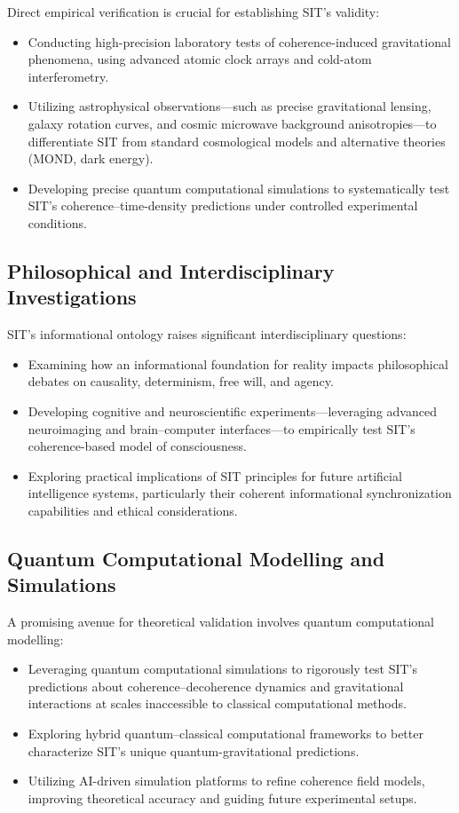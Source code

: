 Direct empirical verification is crucial for establishing SIT's validity:
\begin{itemize}
    \item Conducting high-precision laboratory tests of coherence-induced gravitational phenomena, using advanced atomic clock arrays and cold-atom interferometry.
    \item Utilizing astrophysical observations---such as precise gravitational lensing, galaxy rotation curves, and cosmic microwave background anisotropies---to differentiate SIT from standard cosmological models and alternative theories (MOND, dark energy).
    \item Developing precise quantum computational simulations to systematically test SIT's coherence--time-density predictions under controlled experimental conditions.
\end{itemize}

\subsection{Philosophical and Interdisciplinary Investigations}

SIT's informational ontology raises significant interdisciplinary questions:
\begin{itemize}
    \item Examining how an informational foundation for reality impacts philosophical debates on causality, determinism, free will, and agency.
    \item Developing cognitive and neuroscientific experiments---leveraging advanced neuroimaging and brain--computer interfaces---to empirically test SIT's coherence-based model of consciousness.
    \item Exploring practical implications of SIT principles for future artificial intelligence systems, particularly their coherent informational synchronization capabilities and ethical considerations.
\end{itemize}

\subsection{Quantum Computational Modelling and Simulations}

A promising avenue for theoretical validation involves quantum computational modelling:
\begin{itemize}
    \item Leveraging quantum computational simulations to rigorously test SIT's predictions about coherence--decoherence dynamics and gravitational interactions at scales inaccessible to classical computational methods.
    \item Exploring hybrid quantum--classical computational frameworks to better characterize SIT's unique quantum-gravitational predictions.
    \item Utilizing AI-driven simulation platforms to refine coherence field models, improving theoretical accuracy and guiding future experimental setups.
\end{itemize}

